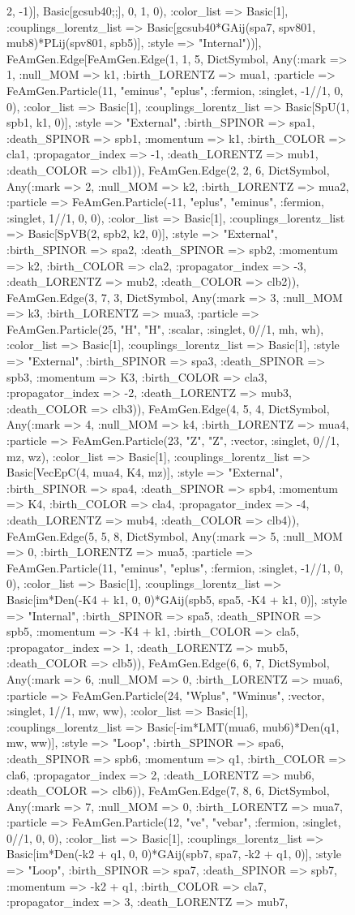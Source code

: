 \documentclass{revtex4}
\begin{document}
\begin{figure}[!htb]
\begin{center}
{2, -1)], Basic[gcsub40;;], 0, 1, 0), :color_list => Basic[1], :couplings_lorentz_list => Basic[gcsub40*GAij(spa7, spv801, mub8)*PLij(spv801, spb5)], :style => "Internal"))], FeAmGen.Edge[FeAmGen.Edge(1, 1, 5, Dict{Symbol, Any}(:mark => 1, :null_MOM => k1, :birth_LORENTZ => mua1, :particle => FeAmGen.Particle(11, "eminus", "eplus", :fermion, :singlet, -1//1, 0, 0), :color_list => Basic[1], :couplings_lorentz_list => Basic[SpU(1, spb1, k1, 0)], :style => "External", :birth_SPINOR => spa1, :death_SPINOR => spb1, :momentum => k1, :birth_COLOR => cla1, :propagator_index => -1, :death_LORENTZ => mub1, :death_COLOR => clb1)), FeAmGen.Edge(2, 2, 6, Dict{Symbol, Any}(:mark => 2, :null_MOM => k2, :birth_LORENTZ => mua2, :particle => FeAmGen.Particle(-11, "eplus", "eminus", :fermion, :singlet, 1//1, 0, 0), :color_list => Basic[1], :couplings_lorentz_list => Basic[SpVB(2, spb2, k2, 0)], :style => "External", :birth_SPINOR => spa2, :death_SPINOR => spb2, :momentum => k2, :birth_COLOR => cla2, :propagator_index => -3, :death_LORENTZ => mub2, :death_COLOR => clb2)), FeAmGen.Edge(3, 7, 3, Dict{Symbol, Any}(:mark => 3, :null_MOM => k3, :birth_LORENTZ => mua3, :particle => FeAmGen.Particle(25, "H", "H", :scalar, :singlet, 0//1, mh, wh), :color_list => Basic[1], :couplings_lorentz_list => Basic[1], :style => "External", :birth_SPINOR => spa3, :death_SPINOR => spb3, :momentum => K3, :birth_COLOR => cla3, :propagator_index => -2, :death_LORENTZ => mub3, :death_COLOR => clb3)), FeAmGen.Edge(4, 5, 4, Dict{Symbol, Any}(:mark => 4, :null_MOM => k4, :birth_LORENTZ => mua4, :particle => FeAmGen.Particle(23, "Z", "Z", :vector, :singlet, 0//1, mz, wz), :color_list => Basic[1], :couplings_lorentz_list => Basic[VecEpC(4, mua4, K4, mz)], :style => "External", :birth_SPINOR => spa4, :death_SPINOR => spb4, :momentum => K4, :birth_COLOR => cla4, :propagator_index => -4, :death_LORENTZ => mub4, :death_COLOR => clb4)), FeAmGen.Edge(5, 5, 8, Dict{Symbol, Any}(:mark => 5, :null_MOM => 0, :birth_LORENTZ => mua5, :particle => FeAmGen.Particle(11, "eminus", "eplus", :fermion, :singlet, -1//1, 0, 0), :color_list => Basic[1], :couplings_lorentz_list => Basic[im*Den(-K4 + k1, 0, 0)*GAij(spb5, spa5, -K4 + k1, 0)], :style => "Internal", :birth_SPINOR => spa5, :death_SPINOR => spb5, :momentum => -K4 + k1, :birth_COLOR => cla5, :propagator_index => 1, :death_LORENTZ => mub5, :death_COLOR => clb5)), FeAmGen.Edge(6, 6, 7, Dict{Symbol, Any}(:mark => 6, :null_MOM => 0, :birth_LORENTZ => mua6, :particle => FeAmGen.Particle(24, "Wplus", "Wminus", :vector, :singlet, 1//1, mw, ww), :color_list => Basic[1], :couplings_lorentz_list => Basic[-im*LMT(mua6, mub6)*Den(q1, mw, ww)], :style => "Loop", :birth_SPINOR => spa6, :death_SPINOR => spb6, :momentum => q1, :birth_COLOR => cla6, :propagator_index => 2, :death_LORENTZ => mub6, :death_COLOR => clb6)), FeAmGen.Edge(7, 8, 6, Dict{Symbol, Any}(:mark => 7, :null_MOM => 0, :birth_LORENTZ => mua7, :particle => FeAmGen.Particle(12, "ve", "vebar", :fermion, :singlet, 0//1, 0, 0), :color_list => Basic[1], :couplings_lorentz_list => Basic[im*Den(-k2 + q1, 0, 0)*GAij(spb7, spa7, -k2 + q1, 0)], :style => "Loop", :birth_SPINOR => spa7, :death_SPINOR => spb7, :momentum => -k2 + q1, :birth_COLOR => cla7, :propagator_index => 3, :death_LORENTZ => mub7, }
\end{center}
\end{figure}
\end{document}
